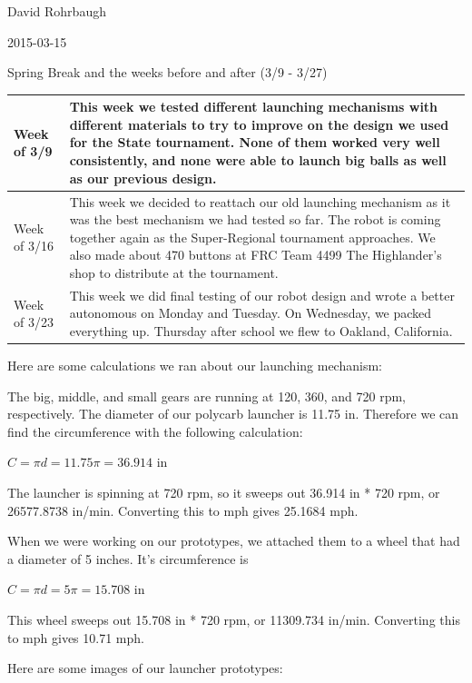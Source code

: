 David Rohrbaugh

2015-03-15

Spring Break and the weeks before and after (3/9 - 3/27)

\begin{tabular}{|p{5cm}|p{5cm}|}
 \hline
 Week of 3/9&
 This week we tested different launching mechanisms with different materials to try to improve on the design we used for the State tournament. None of them worked very well consistently, and none were able to launch big balls as well as our previous design.\\
\hline
 Week of 3/16&
 This week we decided to reattach our old launching mechanism as it was the best mechanism we had tested so far. The robot is coming together again as the Super-Regional tournament approaches. We also made about 470 buttons at FRC Team 4499 The Highlander's shop to distribute at the tournament.\\
\hline
 Week of 3/23&
 This week we did final testing of our robot design and wrote a better autonomous on Monday and Tuesday. On Wednesday, we packed everything up. Thursday after school we flew to Oakland, California.\\
 \hline
\end{tabular}

\medskip

Here are some calculations we ran about our launching mechanism:

The big, middle, and small gears are running at 120, 360, and 720 rpm, respectively. The diameter of our polycarb launcher is 11.75 in. Therefore we can find the circumference with the following calculation:

$C = \pi d = 11.75\pi = 36.914$ in

The launcher is spinning at 720 rpm, so it sweeps out 36.914 in * 720 rpm, or 26577.8738 in/min. Converting this to mph gives 25.1684 mph.

When we were working on our prototypes, we attached them to a wheel that had a diameter of 5 inches. It's circumference is

$C = \pi d = 5\pi = 15.708$ in

This wheel sweeps out 15.708 in * 720 rpm, or 11309.734 in/min. Converting this to mph gives 10.71 mph. 

\pagebreak

Here are some images of our launcher prototypes:

